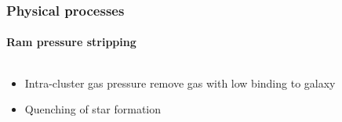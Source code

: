 \begin{frame}
    \frametitle{Physical processes}
    \framesubtitle{Ram pressure stripping}
    \begin{columns}
        \begin{column}{0.5\textwidth}
            \begin{block}{}
                \begin{itemize}
                    \item<1-> Intra-cluster gas pressure remove gas with low
                        binding to galaxy
                    \item<2-> Quenching of star formation
                \end{itemize}
            \end{block}
        \end{column}
        \begin{column}{0.5\textwidth}
        \end{column}
    \end{columns}
\end{frame}


